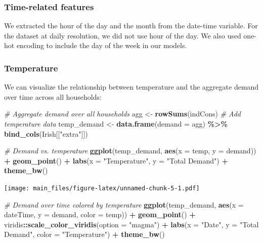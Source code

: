 \documentclass[
]{article}
\newenvironment{Shaded}{\begin{snugshade}}{\end{snugshade}}
\newcommand{\AttributeTok}[1]{\textcolor[rgb]{0.13,0.29,0.53}{#1}}
\newcommand{\CommentTok}[1]{\textcolor[rgb]{0.56,0.35,0.01}{\textit{#1}}}
\newcommand{\FunctionTok}[1]{\textcolor[rgb]{0.13,0.29,0.53}{\textbf{#1}}}
\newcommand{\NormalTok}[1]{#1}
\newcommand{\OtherTok}[1]{\textcolor[rgb]{0.56,0.35,0.01}{#1}}
\newcommand{\SpecialCharTok}[1]{\textcolor[rgb]{0.81,0.36,0.00}{\textbf{#1}}}
\newcommand{\StringTok}[1]{\textcolor[rgb]{0.31,0.60,0.02}{#1}}
\begin{document}
\hypertarget{time-related-features}{%
\subsubsection{Time-related features}\label{time-related-features}}

We extracted the hour of the day and the month from the date-time
variable. For the dataset at daily resolution, we did not use hour of
the day. We also used one-hot encoding to include the day of the week in
our models.

\hypertarget{temperature}{%
\subsubsection{Temperature}\label{temperature}}

We can visualize the relationship between temperature and the aggregate
demand over time across all households:

\begin{Shaded}
\begin{Highlighting}[]
\CommentTok{\# Aggregate demand over all households}
\NormalTok{agg }\OtherTok{\textless{}{-}} \FunctionTok{rowSums}\NormalTok{(indCons)}
\CommentTok{\# Add temperature data}
\NormalTok{temp\_demand }\OtherTok{\textless{}{-}} \FunctionTok{data.frame}\NormalTok{(}\AttributeTok{demand =}\NormalTok{ agg) }\SpecialCharTok{\%\textgreater{}\%}
  \FunctionTok{bind\_cols}\NormalTok{(Irish[[}\StringTok{"extra"}\NormalTok{]])}

\CommentTok{\# Demand vs. temperature}
\FunctionTok{ggplot}\NormalTok{(temp\_demand, }\FunctionTok{aes}\NormalTok{(}\AttributeTok{x =}\NormalTok{ temp, }\AttributeTok{y =}\NormalTok{ demand)) }\SpecialCharTok{+}
  \FunctionTok{geom\_point}\NormalTok{() }\SpecialCharTok{+}
  \FunctionTok{labs}\NormalTok{(}\AttributeTok{x =} \StringTok{"Temperature"}\NormalTok{, }\AttributeTok{y =} \StringTok{"Total Demand"}\NormalTok{) }\SpecialCharTok{+}
  \FunctionTok{theme\_bw}\NormalTok{()}
\end{Highlighting}
\end{Shaded}

\texttt{[image: main\_files/figure-latex/unnamed-chunk-5-1.pdf]}

\begin{Shaded}
\begin{Highlighting}[]
\CommentTok{\# Demand over time colored by temperature}
\FunctionTok{ggplot}\NormalTok{(temp\_demand, }\FunctionTok{aes}\NormalTok{(}\AttributeTok{x =}\NormalTok{ dateTime, }\AttributeTok{y =}\NormalTok{ demand, }\AttributeTok{color =}\NormalTok{ temp)) }\SpecialCharTok{+}
  \FunctionTok{geom\_point}\NormalTok{() }\SpecialCharTok{+}
\NormalTok{  viridis}\SpecialCharTok{::}\FunctionTok{scale\_color\_viridis}\NormalTok{(}\AttributeTok{option =} \StringTok{"magma"}\NormalTok{) }\SpecialCharTok{+}
  \FunctionTok{labs}\NormalTok{(}\AttributeTok{x =} \StringTok{"Date"}\NormalTok{, }\AttributeTok{y =} \StringTok{"Total Demand"}\NormalTok{, }\AttributeTok{color =} \StringTok{"Temperature"}\NormalTok{) }\SpecialCharTok{+}
  \FunctionTok{theme\_bw}\NormalTok{()}
\end{Highlighting}
\end{Shaded}
\end{document}
